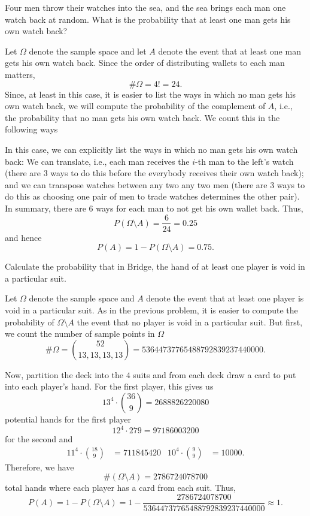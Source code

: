 \begin{problem}[Handout 2, \# 5]
  Four men throw their watches into the sea, and the sea brings each man
  one watch back at random. What is the probability that at least one man
  gets his own watch back?
\end{problem}
\begin{solution}
  Let \(\Omega\) denote the sample space and let \(A\) denote the event
  that at least one man gets his own watch back. Since the order of
  distributing wallets to each man matters,
  \[
    \#\Omega=4!=24.
  \]
  Since, at least in this case, it is easier to list the ways in which no
  man gets his own watch back, we will compute the probability of the
  complement of \(A\), i.e., the probability that no man gets his own watch
  back. We count this in the following ways

  In this case, we can explicitly list the ways in which no man gets his
  own watch back: We can translate, i.e., each man receives the \(i\)-th
  man to the left's watch (there are \(3\) ways to do this before the
  everybody receives their own watch back); and we can transpose watches
  between any two any two men (there are \(3\) ways to do this as choosing
  one pair of men to trade watches determines the other pair). In summary,
  there are \(6\) ways for each man to not get his own wallet back. Thus,
  \[
    P(\Omega\setminus A)=\frac{6}{24}=0.25
  \]
  and hence
  \[
    P(A)=1-P(\Omega\setminus A)=0.75.
  \]
\end{solution}
\newpage

\begin{problem}[Handout 2, \# 7]
  Calculate the probability that in Bridge, the hand of at least one player
  is void in a particular suit.
\end{problem}
\begin{solution}
  Let \(\Omega\) denote the sample space and \(A\) denote the event that at
  least one player is void in a particular suit. As in the previous
  problem, it is easier to compute the probability of \(\Omega\setminus A\)
  the event that no player is void in a particular suit. But first, we
  count the number of sample points in \(\Omega\)
  \[
    \#\Omega=\binom{52}{13,13,13,13}
    =53644737765488792839237440000.
  \]

  Now, partition the deck into the \(4\) suits and from each deck draw a
  card to put into each player's hand. For the first player, this gives us
  \[
    13^4\cdot\binom{36}{9}=2688826220080
  \]
  potential hands for the first player
  \[
    12^4\cdot{27}{9}=97186003200
  \]
  for the second and
  \begin{align*}
    11^4\cdot\binom{18}{9}&=711845420
    &10^4\cdot\binom{9}{9}&=10000.
  \end{align*}
  Therefore, we have
  \[
    \#(\Omega\setminus A)=2786724078700
  \]
  total hands where each player has a card from each suit. Thus,
  \[
    P(A)=1-P(\Omega\setminus
    A)=1-\frac{2786724078700}{53644737765488792839237440000}\approx 1.
  \]
\end{solution}
\newpage

